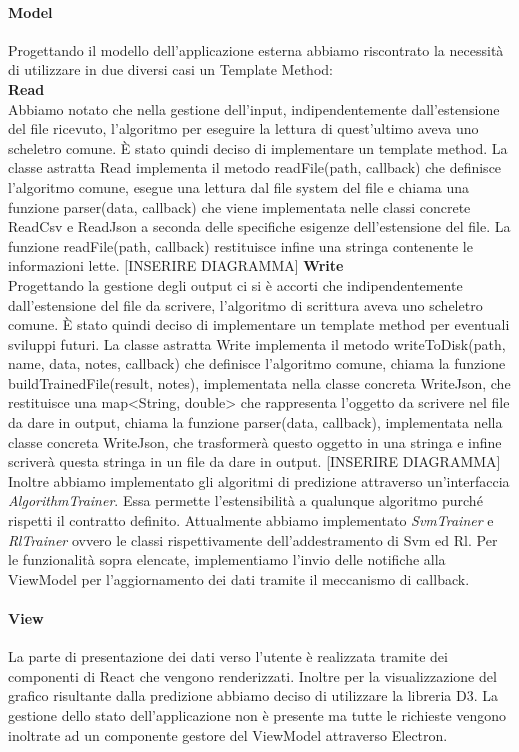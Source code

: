 			\paragraph{Model}
			Progettando il modello dell'applicazione esterna abbiamo riscontrato la necessità di utilizzare in due diversi casi un Template Method: \\
			\textbf{Read} \mbox{} \\ 
			Abbiamo notato che nella gestione dell'input, indipendentemente dall'estensione del file ricevuto, l'algoritmo per eseguire la lettura di quest'ultimo aveva uno scheletro comune. È stato quindi deciso di implementare un template method. La classe astratta Read implementa il metodo readFile(path, callback) che definisce l'algoritmo comune, esegue una lettura dal file system del file e chiama una funzione parser(data, callback) che viene implementata nelle classi concrete ReadCsv e ReadJson a seconda delle specifiche esigenze dell'estensione del file. La funzione readFile(path, callback) restituisce infine una stringa contenente le informazioni lette. 
			[INSERIRE DIAGRAMMA]
			\textbf{Write} \mbox{} \\ 
			Progettando la gestione degli output ci si è accorti che indipendentemente dall'estensione del file da scrivere, l'algoritmo di scrittura aveva uno scheletro comune. È stato quindi deciso di implementare un template method per eventuali sviluppi futuri. La classe astratta Write implementa il metodo writeToDisk(path, name, data, notes, callback) che definisce l'algoritmo comune, chiama la funzione buildTrainedFile(result, notes), implementata nella classe concreta WriteJson, che restituisce una map<String, double> che rappresenta l'oggetto da scrivere nel file da dare in output, chiama la funzione parser(data, callback), implementata nella classe concreta WriteJson, che trasformerà questo oggetto in una stringa e infine scriverà questa stringa in un file da dare in output.
			[INSERIRE DIAGRAMMA]
			Inoltre abbiamo implementato gli algoritmi di predizione attraverso un'interfaccia \textit{AlgorithmTrainer}. Essa permette l'estensibilità a qualunque algoritmo purché rispetti il contratto definito. Attualmente abbiamo implementato \textit{SvmTrainer} e \textit{RlTrainer} ovvero le classi rispettivamente dell'addestramento di Svm ed Rl.
			Per le funzionalità sopra elencate, implementiamo l'invio delle notifiche alla ViewModel per l'aggiornamento dei dati tramite il meccanismo di callback.			
			\paragraph{View}
			La parte di presentazione dei dati verso l'utente è realizzata tramite dei componenti di React che vengono renderizzati. Inoltre per la visualizzazione del grafico risultante dalla predizione abbiamo deciso di utilizzare la libreria D3. La gestione dello stato dell'applicazione non è presente ma tutte le richieste vengono inoltrate ad un componente gestore del ViewModel attraverso Electron.
